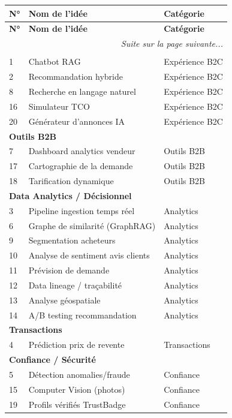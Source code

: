 \documentclass[11pt,a4paper]{article}
\begin{document}
\begin{longtable}{p{1.5cm} p{10cm} p{4.5cm}}
\toprule
\textbf{N°} & \textbf{Nom de l'idée} & \textbf{Catégorie} \\
\midrule
\endfirsthead
\toprule
\textbf{N°} & \textbf{Nom de l'idée} & \textbf{Catégorie} \\
\midrule
\endhead
\midrule
\multicolumn{3}{r}{\textit{Suite sur la page suivante...}} \\
\endfoot
\bottomrule
\endlastfoot

\multicolumn{3}{l}{\textbf{Expérience B2C}} \\
1 & Chatbot RAG & Expérience B2C \\
2 & Recommandation hybride & Expérience B2C \\
8 & Recherche en langage naturel & Expérience B2C \\
16 & Simulateur TCO & Expérience B2C \\
20 & Générateur d'annonces IA & Expérience B2C \\
\midrule
\multicolumn{3}{l}{\textbf{Outils B2B}} \\
7 & Dashboard analytics vendeur & Outils B2B \\
17 & Cartographie de la demande & Outils B2B \\
18 & Tarification dynamique & Outils B2B \\
\midrule
\multicolumn{3}{l}{\textbf{Data Analytics / Décisionnel}} \\
3 & Pipeline ingestion temps réel & Analytics \\
6 & Graphe de similarité (GraphRAG) & Analytics \\
9 & Segmentation acheteurs & Analytics \\
10 & Analyse de sentiment avis clients & Analytics \\
11 & Prévision de demande & Analytics \\
12 & Data lineage / traçabilité & Analytics \\
13 & Analyse géospatiale & Analytics \\
14 & A/B testing recommandation & Analytics \\
\midrule
\multicolumn{3}{l}{\textbf{Transactions}} \\
4 & Prédiction prix de revente & Transactions \\
\midrule
\multicolumn{3}{l}{\textbf{Confiance / Sécurité}} \\
5 & Détection anomalies/fraude & Confiance \\
15 & Computer Vision (photos) & Confiance \\
19 & Profils vérifiés TrustBadge & Confiance \\
\end{longtable}
\end{document}
